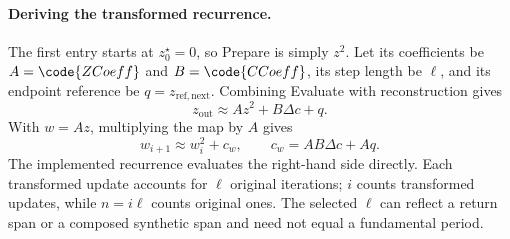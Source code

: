 \paragraph{Deriving the transformed recurrence.}
The first entry starts at $z_0^\star=0$, so Prepare is simply $z^2$.
Let its coefficients be $A=\code{ZCoeff}$ and $B=\code{CCoeff}$, its
step length be $\ell$, and its endpoint reference be
$q=z_{\mathrm{ref,next}}$. Combining Evaluate with reconstruction gives
\begin{equation}
z_{\mathrm{out}}\approx A z^2+B\Delta c+q.
\label{eq:at-return-map}
\end{equation}
With $w=Az$, multiplying the map by $A$ gives
\begin{equation}
w_{i+1}\approx w_i^2+c_w,\qquad c_w=AB\Delta c+Aq.
\label{eq:at-recurrence}
\end{equation}
The implemented recurrence evaluates the right-hand side directly.
Each transformed update accounts for $\ell$ original iterations;
$i$ counts transformed updates, while $n=i\ell$ counts original ones.
The selected $\ell$ can reflect a return span or a composed synthetic
span and need not equal a fundamental period.

